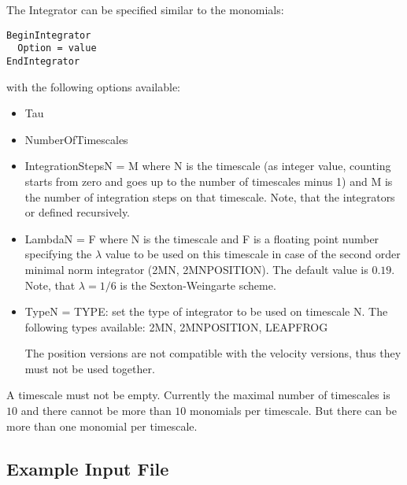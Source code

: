The Integrator can be specified similar to the monomials:
\begin{verbatim}
BeginIntegrator
  Option = value
EndIntegrator
\end{verbatim}
with the following options available:
\begin{itemize}
\item {\ttfamily Tau}
\item {\ttfamily NumberOfTimescales}
\item {\ttfamily IntegrationStepsN = M} where {\ttfamily N} is the
  timescale (as integer value, counting starts from zero and goes up
  to the number of timescales minus 1) and {\ttfamily M} is the number
  of integration steps on that timescale. Note, that the integrators
  or defined recursively.
\item {\ttfamily LambdaN = F} where {\ttfamily N} is the
  timescale and {\ttfamily F} is a floating point number specifying
  the $\lambda$ value to be used on this timescale in case of the
  second order minimal norm integrator (2MN, 2MNPOSITION). The default
  value is $0.19$. Note, that $\lambda = 1/6$ is the Sexton-Weingarte
  scheme. 
\item {\ttfamily TypeN = TYPE}: set the type of integrator to be used
  on timescale {\ttfamily N}. The following types available:
  {\ttfamily 2MN, 2MNPOSITION, LEAPFROG}

  The position versions are not compatible with the velocity versions,
  thus they must not be used together.
\end{itemize}
A timescale must not be empty. Currently the maximal number of
timescales is $10$ and there cannot be more than $10$ monomials per
timescale. But there can be more than one monomial per timescale.

\subsection{Example Input File}

